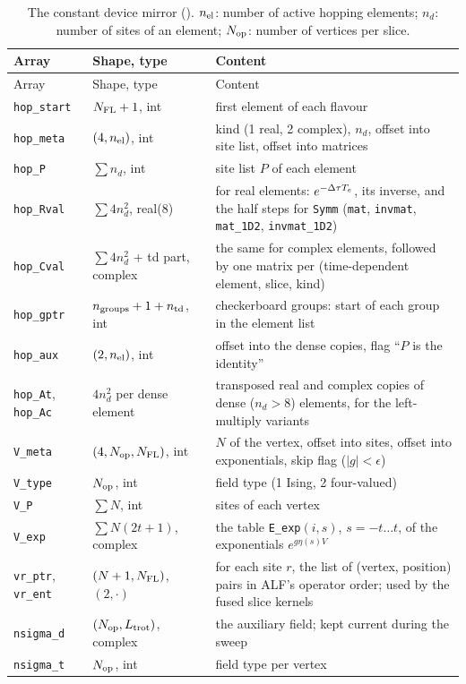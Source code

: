 \begin{small}
\begin{longtable}{@{}p{2.9cm}p{3.6cm}p{8.4cm}@{}}
\caption{The constant device mirror (). $n_{\rm el}$: number of active hopping elements; $n_d$: number of sites of an element; $N_{\rm op}$: number of vertices per slice.}\label{tab:mirror}\\
\toprule
Array & Shape, type & Content \\
\midrule\endfirsthead
\toprule Array & Shape, type & Content \\ \midrule\endhead
\texttt{hop\_start} & $N_{\rm FL}+1$, int & first element of each flavour \\
\texttt{hop\_meta} & $(4,n_{\rm el})$, int & kind (1 real, 2 complex), $n_d$, offset into site list, offset into matrices \\
\texttt{hop\_P} & $\sum n_d$, int & site list $P$ of each element \\
\texttt{hop\_Rval} & $\sum 4n_d^2$, real(8) & for real elements: $e^{-\Delta\tau T_e}$, its inverse, and the half steps for \texttt{Symm} (\texttt{mat}, \texttt{invmat}, \texttt{mat\_1D2}, \texttt{invmat\_1D2}) \\
\texttt{hop\_Cval} & $\sum 4n_d^2$ + td part, complex & the same for complex elements, followed by one matrix per (time-dependent element, slice, kind) \\
\texttt{hop\_gptr} & $n_{\rm groups}+1+n_{\rm td}$, int & checkerboard groups: start of each group in the element list \\
\texttt{hop\_aux} & $(2,n_{\rm el})$, int & offset into the dense copies, flag ``$P$ is the identity'' \\
\texttt{hop\_At}, \texttt{hop\_Ac} & $4n_d^2$ per dense element & transposed real and complex copies of dense ($n_d>8$) elements, for the left-multiply variants \\
\texttt{V\_meta} & $(4,N_{\rm op},N_{\rm FL})$, int & $N$ of the vertex, offset into sites, offset into exponentials, skip flag ($|g|<\epsilon$) \\
\texttt{V\_type} & $N_{\rm op}$, int & field type (1 Ising, 2 four-valued) \\
\texttt{V\_P} & $\sum N$, int & sites of each vertex \\
\texttt{V\_exp} & $\sum N(2t+1)$, complex & the table \texttt{E\_exp}$(i,s)$, $s=-t\ldots t$, of the exponentials $e^{g\eta(s)V}$ \\
\texttt{vr\_ptr}, \texttt{vr\_ent} & $(N+1,N_{\rm FL})$, $(2,\cdot)$ & for each site $r$, the list of (vertex, position) pairs in ALF's operator order; used by the fused slice kernels \\
\texttt{nsigma\_d} & $(N_{\rm op},L_{\rm trot})$, complex & the auxiliary field; kept current during the sweep \\
\texttt{nsigma\_t} & $N_{\rm op}$, int & field type per vertex \\
\bottomrule
\end{longtable}
\end{small}

